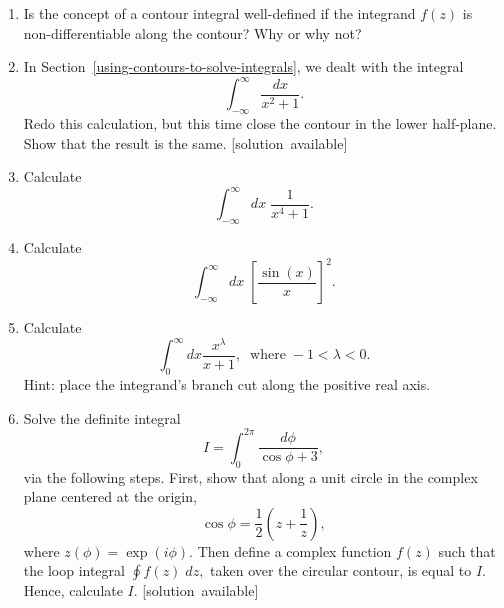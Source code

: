 \documentclass[10pt,a4paper]{article}
\begin{document}
\begin{enumerate}
\item
  Is the concept of a contour integral well-defined if the integrand
  $f(z)$ is non-differentiable along the contour? Why or why not?

\item
  In Section~\ref{using-contours-to-solve-integrals}, we dealt with
  the integral
  \begin{equation}
    \int_{-\infty}^\infty \frac{dx}{x^2 + 1}.
  \end{equation}
  Redo this calculation, but this time close the contour in the lower
  half-plane.  Show that the result is the same.
  \hfill{\scriptsize [solution~available]}

\item
  Calculate
  \begin{equation}
    \int_{-\infty}^\infty dx\; \frac{1}{x^4 + 1}.
  \end{equation}

\item
  Calculate
  \begin{equation}
    \int_{-\infty}^\infty dx\; \left[\frac{\sin(x)}{x}\right]^2.
  \end{equation}

\item
  Calculate
  \begin{equation}
    \int_0^\infty dx \frac{x^{\lambda}}{x+1}, \;\;\mathrm{where}\; -1 < \lambda < 0.
  \end{equation}
  Hint: place the integrand's branch cut along the positive real axis.

\item
  Solve the definite integral
  \begin{equation}
    I = \int_0^{2\pi} \frac{d\phi}{\cos\phi+3},
  \end{equation}
  via the following steps. First, show that along a unit circle in the
  complex plane centered at the origin,
  \begin{equation}
    \cos\phi = \frac{1}{2}\left(z+\frac{1}{z}\right),
  \end{equation}
  where $z(\phi) = \exp(i\phi)$. Then define a complex function $f(z)$
  such that the loop integral $\oint f(z) \;dz,$ taken over the
  circular contour, is equal to $I$. Hence, calculate
  $I$.
  \vskip -0.05in
  \hfill{\scriptsize [solution~available]}
  

\end{enumerate}
\end{document}
